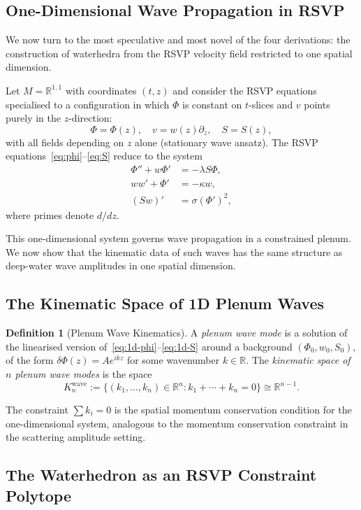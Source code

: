 \documentclass[12pt, oneside]{amsart}
\theoremstyle{plain}
\theoremstyle{definition}
\newtheorem{definition}[theorem]{Definition}
\theoremstyle{remark}
\newcommand{\R}{\mathbb{R}}
\begin{document}
\subsection{One-Dimensional Wave Propagation in RSVP}

We now turn to the most speculative and most novel of the four derivations: the construction of waterhedra from the RSVP velocity field restricted to one spatial dimension.

Let $M = \R^{1,1}$ with coordinates $(t, z)$ and consider the RSVP equations specialised to a configuration in which $\Phi$ is constant on $t$-slices and $v$ points purely in the $z$-direction:
\[
  \Phi = \Phi(z), \quad v = w(z)\partial_z, \quad S = S(z),
\]
with all fields depending on $z$ alone (stationary wave ansatz). The RSVP equations~\eqref{eq:phi}--\eqref{eq:S} reduce to the system
\begin{align}
  \Phi'' + w\Phi' &= -\lambda S\Phi, \label{eq:1d-phi}\\
  w w' + \Phi' &= -\kappa w, \label{eq:1d-v}\\
  (Sw)' &= \sigma(\Phi')^2, \label{eq:1d-S}
\end{align}
where primes denote $d/dz$.

This one-dimensional system governs wave propagation in a constrained plenum. We now show that the kinematic data of such waves has the same structure as deep-water wave amplitudes in one spatial dimension.

\subsection{The Kinematic Space of 1D Plenum Waves}

\begin{definition}[Plenum Wave Kinematics]
\label{def:wave-kinematics}
A \emph{plenum wave mode} is a solution of the linearised version of~\eqref{eq:1d-phi}--\eqref{eq:1d-S} around a background $(\Phi_0, w_0, S_0)$, of the form $\delta\Phi(z) = A e^{ikz}$ for some wavenumber $k \in \R$. The \emph{kinematic space of $n$ plenum wave modes} is the space
\[
  K_n^{\text{wave}} := \{(k_1, \ldots, k_n) \in \R^n : k_1 + \cdots + k_n = 0\} \cong \R^{n-1}.
\]
\end{definition}

The constraint $\sum k_i = 0$ is the spatial momentum conservation condition for the one-dimensional system, analogous to the momentum conservation constraint in the scattering amplitude setting.

\subsection{The Waterhedron as an RSVP Constraint Polytope}
\end{document}

